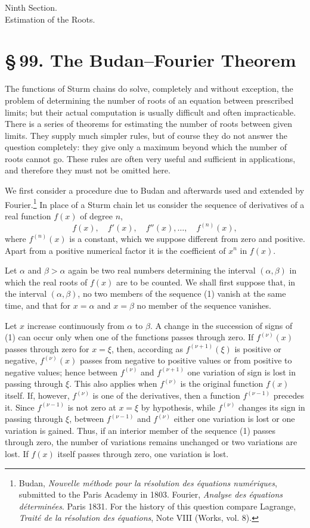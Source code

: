 \documentclass[11pt]{article}
\providecommand{\sect}[2]{\section*{\S\,#1. #2}}
\begin{document}
\begin{center}
{\large Ninth Section.}\\[0.6em]
{\Large Estimation of the Roots.}
\end{center}

\sect{99}{The Budan--Fourier Theorem}

The functions of Sturm chains do solve, completely and without exception, the problem of determining the number of roots of an equation between prescribed limits; but their actual computation is usually difficult and often impracticable. There is a series of theorems for estimating the number of roots between given limits. They supply much simpler rules, but of course they do not answer the question completely: they give only a maximum beyond which the number of roots cannot go. These rules are often very useful and sufficient in applications, and therefore they must not be omitted here.

We first consider a procedure due to Budan and afterwards used and extended by Fourier.\footnote{Budan, \emph{Nouvelle méthode pour la résolution des équations numériques}, submitted to the Paris Academy in 1803. Fourier, \emph{Analyse des équations déterminées}. Paris 1831. For the history of this question compare Lagrange, \emph{Traité de la résolution des équations}, Note VIII (Works, vol. 8).} In place of a Sturm chain let us consider the sequence of derivatives of a real function $f(x)$ of degree $n$,
\begin{equation}
        f(x),\quad f'(x),\quad f''(x),\ldots,\quad f^{(n)}(x),
\tag{1}
\end{equation}
where $f^{(n)}(x)$ is a constant, which we suppose different from zero and positive. Apart from a positive numerical factor it is the coefficient of $x^n$ in $f(x)$.

Let $\alpha$ and $\beta>\alpha$ again be two real numbers determining the interval $(\alpha,\beta)$ in which the real roots of $f(x)$ are to be counted. We shall first suppose that, in the interval $(\alpha,\beta)$, no two members of the sequence (1) vanish at the same time, and that for $x=\alpha$ and $x=\beta$ no member of the sequence vanishes.

Let $x$ increase continuously from $\alpha$ to $\beta$. A change in the succession of signs of (1) can occur only when one of the functions passes through zero. If $f^{(\nu)}(x)$ passes through zero for $x=\xi$, then, according as $f^{(\nu+1)}(\xi)$ is positive or negative, $f^{(\nu)}(x)$ passes from negative to positive values or from positive to negative values; hence between $f^{(\nu)}$ and $f^{(\nu+1)}$ one variation of sign is lost in passing through $\xi$. This also applies when $f^{(\nu)}$ is the original function $f(x)$ itself. If, however, $f^{(\nu)}$ is one of the derivatives, then a function $f^{(\nu-1)}$ precedes it. Since $f^{(\nu-1)}$ is not zero at $x=\xi$ by hypothesis, while $f^{(\nu)}$ changes its sign in passing through $\xi$, between $f^{(\nu-1)}$ and $f^{(\nu)}$ either one variation is lost or one variation is gained. Thus, if an interior member of the sequence (1) passes through zero, the number of variations remains unchanged or two variations are lost. If $f(x)$ itself passes through zero, one variation is lost.
\end{document}
